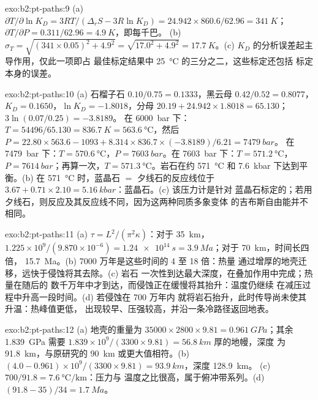 \begin{solution}{exo:b2:pt-paths:9}
(a) $\partial T/\partial\ln K_D = 3RT/(\Delta_r S - 3R\ln K_D) = 24.942\times860.6/62.96 =
\qty{341}{K}$；$\partial T/\partial P = 0.311/62.96 = \qty{4.9}{K}$，即每千巴。
(b) $\sigma_T = \sqrt{(341\times0.05)^2 + 4.9^2} = \sqrt{17.0^2 + 4.9^2} =
\qty{17.7}{K}$。(c) $K_D$ 的分析误差起主导作用，仅此一项即占
最佳标定结果中 \qty{25}{\celsius} 的三分之二，这些标定还包括
标定本身的误差。
\end{solution}

\begin{solution}{exo:b2:pt-paths:10}
(a) 石榴子石 $0.10/0.75 = 0.1333$，黑云母 $0.42/0.52 = 0.8077$，$K_D = 0.1650$，$\ln K_D =
-1.8018$，分母 $20.19 + 24.942\times1.8018 = 65.130$；$3\ln(0.07/0.25) = -3.8189$。
在 \qty{6000}{bar} 下：$T = 54496/65.130 = \qty{836.7}{K} = \qty{563.6}{\celsius}$，然后 $P
= 22.80\times563.6 - 1093 + 8.314\times836.7\times(-3.8189)/6.21 = \qty{7479}{bar}$。
在 \qty{7479}{bar} 下：$T = \qty{570.6}{\celsius}$，$P = \qty{7603}{bar}$。在
\qty{7603}{bar} 下：$T = \qty{571.2}{\celsius}$，$P = \qty{7614}{bar}$；再算一次，$T =
\qty{571.3}{\celsius}$。岩石在约 \qty{571}{\celsius} 和
\qty{7.6}{kbar} 下达到平衡。(b) 在 \qty{571}{\celsius} 时，蓝晶石 $=$ 夕线石的反应线位于 $3.67
+ 0.71\times2.10 = \qty{5.16}{kbar}$：蓝晶石。(c) 该压力计是针对
蓝晶石标定的；若用夕线石，则反应及其反应线不同，因为这两种同质多象变体
的吉布斯自由能并不相同。
\end{solution}

\begin{solution}{exo:b2:pt-paths:11}
(a) $\tau = L^2/(\pi^2\kappa)$：对于 \qty{35}{km}，$1.225\times10^9/(9.870\times10^{-6}) =
\qty{1.24e14}{s} = \qty{3.9}{Ma}$；对于 \qty{70}{km}，时间长四倍，
\qty{15.7}{Ma}。(b) 7000 万年是这些时间的 4 至 18 倍：热量
通过增厚的地壳迁移，远快于侵蚀将其去除。(c) 岩石
一次性到达最大深度，在叠加作用中完成；热量在随后的
数千万年中才到达，而侵蚀正在缓慢将其抬升：温度仍继续
在减压过程中升高一段时间。(d) 若侵蚀在 700 万年内
就将岩石抬升，此时传导尚未使其升温：热峰值更低，
出现较早、压强较高，并沿一条冷路径返回地表。
\end{solution}

\begin{solution}{exo:b2:pt-paths:12}
(a) 地壳的重量为 $35000\times2800\times9.81 = \qty{0.961}{GPa}$；其余
\qty{1.839}{GPa} 需要 $1.839\times10^9/(3300\times9.81) = \qty{56.8}{km}$ 厚的地幔，深度
为 \qty{91.8}{km}，与原研究的 \qty{90}{km} 或更大值相符。(b) $(4.0 -
0.961)\times10^9/(3300\times9.81) = \qty{93.9}{km}$，深度 \qty{128.9}{km}。
(c) $700/91.8 = \qty{7.6}{\celsius\per\km}$：压力与
温度之比很高，属于俯冲带系列。(d) $(91.8 - 35)/34 = \qty{1.7}{Ma}$。
\end{solution}

